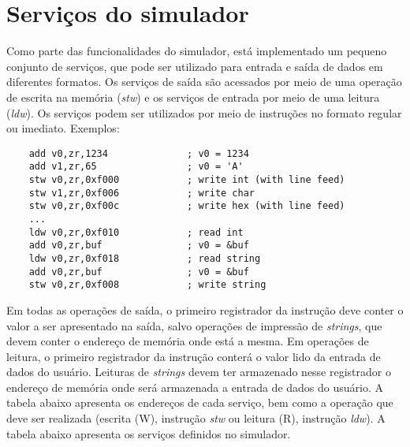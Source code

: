 \documentclass[11pt,a4paper]{report}
\begin{document}
\section{Serviços do simulador}

Como parte das funcionalidades do simulador, está implementado um pequeno
conjunto de serviços, que pode ser utilizado para entrada e saída de
dados em diferentes formatos. Os serviços de saída são acessados por
meio de uma operação de escrita na memória (\textit{stw}) e os serviços
de entrada por meio de uma leitura (\textit{ldw}). Os serviços podem ser
utilizados por meio de instruções no formato regular ou imediato.
Exemplos:

\begin{verbatim}
    add v0,zr,1234              ; v0 = 1234
    add v1,zr,65                ; v0 = 'A'
    stw v0,zr,0xf000            ; write int (with line feed)
    stw v1,zr,0xf006            ; write char
    stw v0,zr,0xf00c            ; write hex (with line feed)
    ...
    ldw v0,zr,0xf010            ; read int
    add v0,zr,buf               ; v0 = &buf
    ldw v0,zr,0xf018            ; read string
    add v0,zr,buf               ; v0 = &buf
    stw v0,zr,0xf008            ; write string
\end{verbatim}

Em todas as operações de saída, o primeiro registrador da instrução deve
conter o valor a ser apresentado na saída, salvo operações de impressão
de \textit{strings}, que devem conter o endereço de memória onde está
a mesma. Em operações de leitura, o primeiro registrador da instrução
conterá o valor lido da entrada de dados do usuário. Leituras de
\textit{strings} devem ter armazenado nesse registrador o endereço de
memória onde será armazenada a entrada de dados do usuário. A tabela
abaixo apresenta os endereços de cada serviço, bem como a operação que
deve ser realizada (escrita (W), instrução \textit{stw} ou leitura (R),
instrução \textit{ldw}). A tabela abaixo apresenta os serviços definidos
no simulador.
\end{document}
